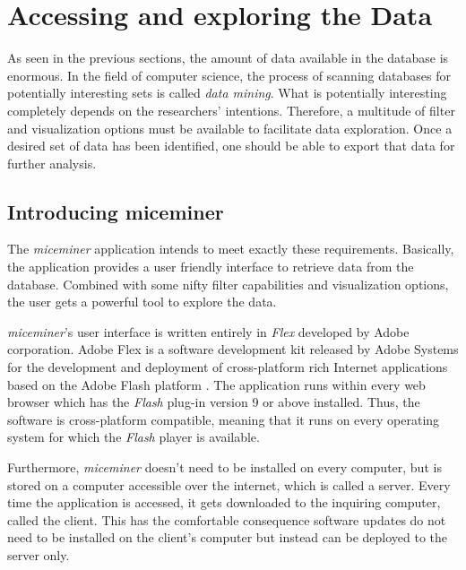 \newpage
\section{Accessing and exploring the Data }
\label{sec:dataaccessandexp}

As seen in the previous sections, the amount of data available in the database is enormous. In the field of computer science, the process of scanning databases for potentially interesting sets is called \textit{data mining}. What is potentially interesting completely depends on the researchers' intentions. Therefore, a multitude of filter and visualization options must be available to facilitate data exploration. Once a desired set of data has been identified, one should be able to export that data for further analysis. 

\subsection{Introducing miceminer}
\label{subsec:dataexp}

The \textit{miceminer} application intends to meet exactly these requirements. Basically, the application provides a user friendly interface to retrieve data from the database. Combined with some nifty filter capabilities and visualization options, the user gets a powerful tool to explore the data.

\textit{miceminer}'s user interface is written entirely in \textit{Flex} developed by Adobe corporation. Adobe Flex is a software development kit released by Adobe Systems for the development and deployment of cross-platform rich Internet applications based on the Adobe Flash platform \citep{wiki:flex}. The application runs within every web browser which has the \textit{Flash} plug-in version 9 or above installed. Thus, the software is cross-platform compatible, meaning that it runs on every operating system for which the \textit{Flash} player is available. 
 
Furthermore, \textit{miceminer} doesn't need to be installed on every computer, but is stored on a computer accessible over the internet, which is called a server. Every time the application is accessed, it gets downloaded to the inquiring computer, called the client. This has the comfortable consequence software updates do not need to be installed on the client's computer but instead can be deployed to the server only.     

